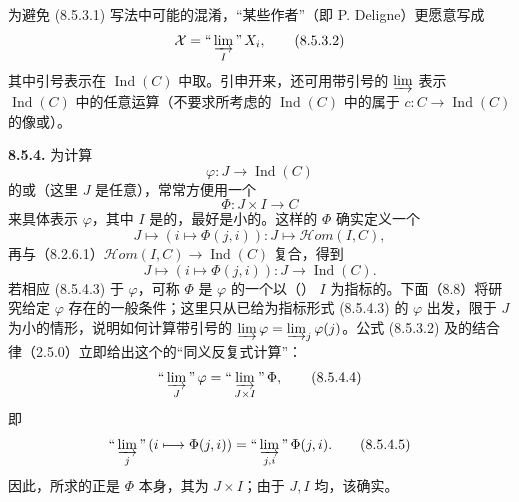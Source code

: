 为避免 (8.5.3.1) 写法中可能的混淆，“某些作者”（即 P. Deligne）更愿意写成
\[
\mathcal X=\text{“}\varinjlim_I\text{”}\,X_i,\tag{8.5.3.2}
\]
其中引号表示在  $\operatorname{Ind}(C)$ 中取。引申开来，还可用带引号的 $\varinjlim$ 表示 $\operatorname{Ind}(C)$ 中的任意运算（不要求所考虑的 $\operatorname{Ind}(C)$ 中的属于 $c:C\to\operatorname{Ind}(C)$ 的像或）。

\textbf{8.5.4.} 为计算
\[
\varphi:J\longrightarrow\operatorname{Ind}(C)\tag{8.5.4.1}
\]
的或（这里 $J$ 是任意），常常方便用一个
\[
\Phi:J\times I\longrightarrow C\tag{8.5.4.2}
\]
来具体表示 $\varphi$，其中 $I$ 是的，最好是小的。这样的 $\Phi$ 确实定义一个
\[
J\longmapsto(i\longmapsto\Phi(j,i)):J\longmapsto\mathscr{H}\!om(I,C),
\]
再与（8.2.6.1）$\mathscr{H}\!om(I,C)\to\operatorname{Ind}(C)$ 复合，得到
\[
J\longmapsto(i\longmapsto\Phi(j,i)):J\longrightarrow\operatorname{Ind}(C).\tag{8.5.4.3}
\]
若相应 (8.5.4.3) 于 $\varphi$，可称 $\Phi$ 是 $\varphi$ 的一个以（） $I$ 为指标的。下面（8.8）将研究给定 $\varphi$ 存在的一般条件；这里只从已给为指标形式 (8.5.4.3) 的 $\varphi$ 出发，限于 $J$ 为小的情形，说明如何计算带引号的 $\varinjlim\varphi=\varinjlim_j\varphi(j)$。公式 (8.5.3.2) 及的结合律（2.5.0）立即给出这个的“同义反复式计算”：
\[
\text{“}\varinjlim_J\text{”}\,\varphi
=\text{“}\varinjlim_{J\times I}\text{”}\,\Phi,\tag{8.5.4.4}
\]
即
\[
\text{“}\varinjlim_j\text{”}\,(i\longmapsto\Phi(j,i))
=\text{“}\varinjlim_{j,i}\text{”}\,\Phi(j,i).\tag{8.5.4.5}
\]
因此，所求的正是 $\Phi$ 本身，其为 $J\times I$；由于 $J,I$ 均，该确实。
